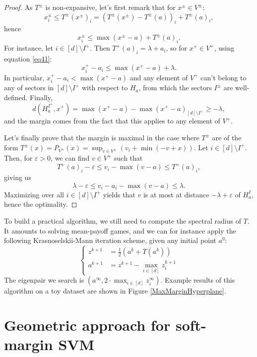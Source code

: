 \documentclass[oneside,english,a4paper]{amsart}
\numberwithin{equation}{section}
\numberwithin{figure}{section}
\theoremstyle{plain}
\theoremstyle{definition}
\theoremstyle{plain}
\theoremstyle{remark}
\theoremstyle{plain}
\theoremstyle{definition}
\theoremstyle{definition}
\begin{document}
\begin{proof}
As $T^{\pm}$ is non-expansive, let's first remark that for $x^{\pm}\in V^{\pm}$:
\[
x_{i}^{\pm}\le T^{\pm}(x^{\pm})_{i}=\left(T^{\pm}(x^{\pm})-T^{\pm}(a)\right)_{i}+T^{\pm}(a)_{i},
\]
hence 
\begin{equation}
x_{i}^{\pm}\le\max(x^{\pm}-a)+T^{\pm}(a)_{i}.\label{eq41}
\end{equation}
For instance, let $i\in[d]\setminus I^{+}$. Then $T^{+}(a)_{i}=\lambda+a_{i}$,
so for $x^{+}\in V^{+}$, using equation \ref{eq41}:
\[
x_{i}^{+}-a_{i}\le\max(x^{+}-a)+\lambda.
\]
In particular, $x_{i}^{+}-a_{i}<\max(x^{+}-a)$ and any element of
$V^{+}$ can't belong to any of sectors in $[d]\setminus I^{+}$ with
respect to $H_{a}$, from which the sectors $I^{\pm}$ are well-defined.
Finally, 
\[
d(H_{a}^{I^{+}},x^{+})=\max(x^{+}-a)-\max(x^{+}-a)_{[d]\setminus I^{+}}\ge-\lambda,
\]
and the margin comes from the fact that this applies to any element
of $V^{+}$.

Let's finally prove that the margin is maximal in the case where $T^{\pm}$
are of the form $T^{\pm}(x)=P_{V^{\pm}}(x)=\sup_{v\in V^{\pm}}\left(v_{i}+\min(-v+x)\right).$
Let $i\in[d]\setminus I^{+}$. Then, for $\varepsilon>0$, we can
find $v\in V^{+}$ such that 
\[
T^{+}(a)_{i}-\varepsilon\le v_{i}-\max(v-a)\le T^{+}(a)_{i},
\]
giving us 
\[
\lambda-\varepsilon\le v_{i}-a_{i}-\max(v-a)\le\lambda.
\]
Maximizing over all $i\in[d]\setminus I^{+}$ yields that $v$ is
at most at distance $-\lambda+\varepsilon$ of $H_{a}^{I}$, hence
the optimality.
\end{proof}
%
To build a practical algorithm, we still need to compute the spectral
radius of $T$. It amounts to solving mean-payoff games, and we can
for instance apply the following Krasnoselskii-Mann iteration scheme,
given any initial point $a^{0}$:
\[
\begin{cases}
z^{k+1} & =\frac{1}{2}\left(a^{k}+T(a^{k})\right)\\
a^{k+1} & =z^{k+1}-\max_{i\in[d]}z_{i}^{k+1}
\end{cases}
\]
The eigenpair we search is $(a^{\infty},2\cdot\max_{i\in[d]}z_{i}^{\infty})$.
Example results of this algorithm on a toy dataset are shown in Figure
\ref{MaxMarginHyperplane}.

\section{Geometric approach for soft-margin SVM}
\end{document}
